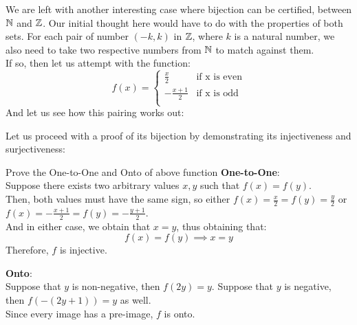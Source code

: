 We are left with another interesting case where bijection can be certified, between $\mathbb{N}$ and $\mathbb{Z}$. 
Our initial thought here would have to do with the properties of both sets. For each pair of number $(-k, k)$ in $\mathbb{Z}$, where $k$ is a natural number, we also need to take two respective numbers from $\mathbb{N}$ to match against them. \\
If so, then let us attempt with the function:
\[
    f(x) = 
    \begin{cases}
        \frac{x}{2} &\text{if x is even} \\
        -\frac{x + 1}{2} &\text{if x is odd} \\
    \end{cases}
\]
And let us see how this pairing works out:
\begin{center}
\end{center}
Let us proceed with a proof of its bijection by demonstrating its injectiveness and surjectiveness:
\begin{ln-quest}{Prove the One-to-One and Onto of above function}{}
    \textbf{One-to-One}: \\
    Suppose there exists two arbitrary values $x, y$ such that $f(x) = f(y)$. \\
    Then, both values must have the same sign, so either $f(x) = \frac{x}{2} = f(y) = \frac{y}{2}$ or $f(x) = -\frac{x + 1}{2} = f(y) = -\frac{y + 1}{2}$. \\
    And in either case, we obtain that $x = y$, thus obtaining that:
    \[f(x) = f(y) \implies x = y\]
    Therefore, $f$ is injective.
    
    \textbf{Onto}: \\
    Suppose that $y$ is non-negative, then $f(2y) = y$. Suppose that $y$ is negative, then $f(-(2y + 1)) = y$ as well. \\
    Since every image has a pre-image, $f$ is onto.
\end{ln-quest}

